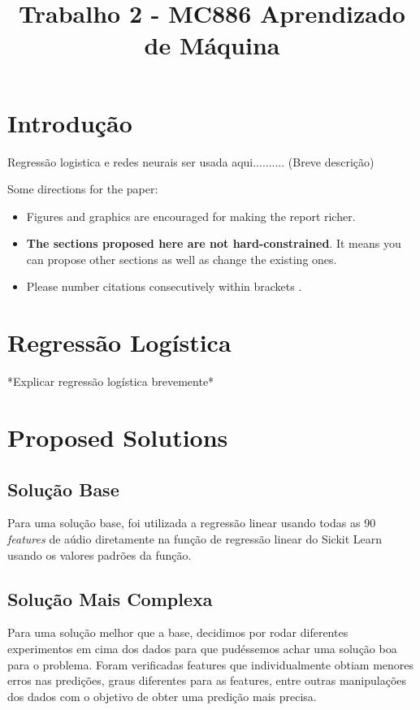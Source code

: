 \documentclass[conference]{IEEEtran}
\begin{document}
\title{Trabalho 2 - MC886 Aprendizado de Máquina}

\author{
\and
{}
}

\maketitle

\section{Introdução}

Regressão logistica e redes neurais ser usada aqui.......... (Breve descrição)

Some directions for the paper:

\begin{itemize}
	\item Figures and graphics are encouraged for making the
	report richer.
	\item {\bf The sections proposed here are not hard-constrained}. It means you can propose other sections as well as change the existing ones.
	\item Please number citations consecutively within brackets \cite{b1}. 
\end{itemize}

\section{Regressão Logística}
 
*Explicar regressão logística brevemente*

\section{Proposed Solutions}
\subsection{Solução Base}
Para uma solução base, foi utilizada a regressão linear usando todas as 90 \textit{features} de aúdio diretamente na função de regressão linear do Sickit Learn usando os valores padrões da função.

\subsection{Solução Mais Complexa}
Para uma solução melhor que a base, decidimos por rodar diferentes experimentos em cima dos dados para que pudéssemos achar uma solução boa para o problema. Foram verificadas features que individualmente obtiam menores erros nas predições, graus diferentes para as features, entre outras manipulações dos dados com o objetivo de obter uma predição mais precisa.
\end{document}
